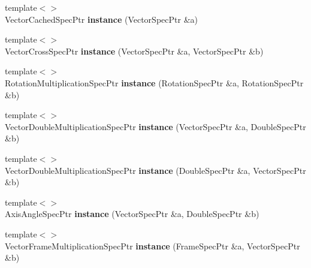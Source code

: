 \begin{DoxyCompactItemize}
\item 
\hypertarget{namespacegiskard__suturo_ac1dc8361d2004f1987fda6a2925585e9}{{\footnotesize template$<$$>$ }\\Vector\-Cached\-Spec\-Ptr {\bfseries instance} (Vector\-Spec\-Ptr \&a)}\label{namespacegiskard__suturo_ac1dc8361d2004f1987fda6a2925585e9}

\item 
\hypertarget{namespacegiskard__suturo_ab09273d4b5bab8307a5e80f1107b7db8}{{\footnotesize template$<$$>$ }\\Vector\-Cross\-Spec\-Ptr {\bfseries instance} (Vector\-Spec\-Ptr \&a, Vector\-Spec\-Ptr \&b)}\label{namespacegiskard__suturo_ab09273d4b5bab8307a5e80f1107b7db8}

\item 
\hypertarget{namespacegiskard__suturo_abef2f2d62bff65b398ed1b2aa1c9fa37}{{\footnotesize template$<$$>$ }\\Rotation\-Multiplication\-Spec\-Ptr {\bfseries instance} (Rotation\-Spec\-Ptr \&a, Rotation\-Spec\-Ptr \&b)}\label{namespacegiskard__suturo_abef2f2d62bff65b398ed1b2aa1c9fa37}

\item 
\hypertarget{namespacegiskard__suturo_a2ce07c5e8a865213e0bb7fb769ae7025}{{\footnotesize template$<$$>$ }\\Vector\-Double\-Multiplication\-Spec\-Ptr {\bfseries instance} (Vector\-Spec\-Ptr \&a, Double\-Spec\-Ptr \&b)}\label{namespacegiskard__suturo_a2ce07c5e8a865213e0bb7fb769ae7025}

\item 
\hypertarget{namespacegiskard__suturo_abe5e5ad016876175c5c187d0d438a2a1}{{\footnotesize template$<$$>$ }\\Vector\-Double\-Multiplication\-Spec\-Ptr {\bfseries instance} (Double\-Spec\-Ptr \&a, Vector\-Spec\-Ptr \&b)}\label{namespacegiskard__suturo_abe5e5ad016876175c5c187d0d438a2a1}

\item 
\hypertarget{namespacegiskard__suturo_aa527a2c6963e19f82b598b66d8dd4bba}{{\footnotesize template$<$$>$ }\\Axis\-Angle\-Spec\-Ptr {\bfseries instance} (Vector\-Spec\-Ptr \&a, Double\-Spec\-Ptr \&b)}\label{namespacegiskard__suturo_aa527a2c6963e19f82b598b66d8dd4bba}

\item 
\hypertarget{namespacegiskard__suturo_a9080239e83f783a5a53a42d6a7214451}{{\footnotesize template$<$$>$ }\\Vector\-Frame\-Multiplication\-Spec\-Ptr {\bfseries instance} (Frame\-Spec\-Ptr \&a, Vector\-Spec\-Ptr \&b)}\label{namespacegiskard__suturo_a9080239e83f783a5a53a42d6a7214451}


\end{DoxyCompactItemize}
